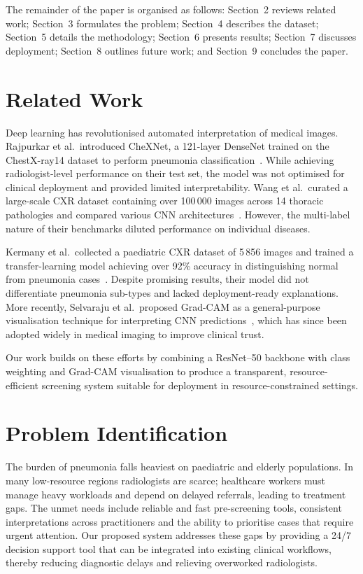 \documentclass[sigconf]{acmart}
\begin{document}
The remainder of the paper is organised as follows: Section~2 reviews related work; Section~3 formulates the problem; Section~4 describes the dataset; Section~5 details the methodology; Section~6 presents results; Section~7 discusses deployment; Section~8 outlines future work; and Section~9 concludes the paper.

\section{Related Work}
Deep learning has revolutionised automated interpretation of medical images. Rajpurkar et al.\ introduced CheXNet, a 121-layer DenseNet trained on the ChestX-ray14 dataset to perform pneumonia classification~\cite{Rajpurkar2017}. While achieving radiologist-level performance on their test set, the model was not optimised for clinical deployment and provided limited interpretability. Wang et al.\ curated a large-scale CXR dataset containing over 100\,000 images across 14 thoracic pathologies and compared various CNN architectures~\cite{Wang2017}. However, the multi-label nature of their benchmarks diluted performance on individual diseases.

Kermany et al.\ collected a paediatric CXR dataset of 5\,856 images and trained a transfer-learning model achieving over 92\% accuracy in distinguishing normal from pneumonia cases~\cite{Kermany2018}. Despite promising results, their model did not differentiate pneumonia sub-types and lacked deployment-ready explanations. More recently, Selvaraju et al.\ proposed Grad-CAM as a general-purpose visualisation technique for interpreting CNN predictions~\cite{Selvaraju2017}, which has since been adopted widely in medical imaging to improve clinical trust.

Our work builds on these efforts by combining a ResNet--50 backbone with class weighting and Grad-CAM visualisation to produce a transparent, resource-efficient screening system suitable for deployment in resource-constrained settings.

\section{Problem Identification}
The burden of pneumonia falls heaviest on paediatric and elderly populations. In many low-resource regions radiologists are scarce; healthcare workers must manage heavy workloads and depend on delayed referrals, leading to treatment gaps. The unmet needs include reliable and fast pre-screening tools, consistent interpretations across practitioners and the ability to prioritise cases that require urgent attention. Our proposed system addresses these gaps by providing a 24/7 decision support tool that can be integrated into existing clinical workflows, thereby reducing diagnostic delays and relieving overworked radiologists.
\end{document}

